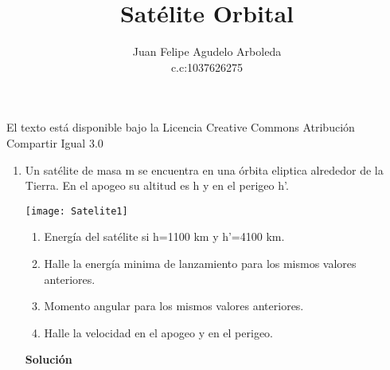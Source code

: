 \documentclass[12pt]{article}
\title{Satélite Orbital}
\author{Juan Felipe Agudelo Arboleda \\c.c:1037626275}
\begin{document}
\maketitle


El texto está disponible bajo la Licencia Creative Commons Atribución Compartir Igual 3.0
\begin{enumerate} 

\item Un satélite de masa m se encuentra en una órbita eliptica alrededor de la Tierra. En el apogeo su altitud es h y en el perigeo h'. 

  \begin{minipage}{0.4\linewidth}
    \texttt{[image: Satelite1]}
  \end{minipage}
  \begin{minipage}{0.6\linewidth}
    \begin{enumerate}
    \item Energía del satélite si h=1100 km y h'=4100 km.
      \label{item:JFa}
    \item Halle la energía minima de lanzamiento para los mismos valores anteriores.
      \label{item:JFb}
      \item Momento angular para los mismos valores anteriores.
      \label{item:JFc}    
     \item Halle la velocidad en el apogeo y en el perigeo.
      \label{item:JFd}
    \end{enumerate}
  \end{minipage}
  
  \textbf{Solución}
  \begin{itemize}  
  

\end{itemize}
\end{enumerate}
\end{document}
